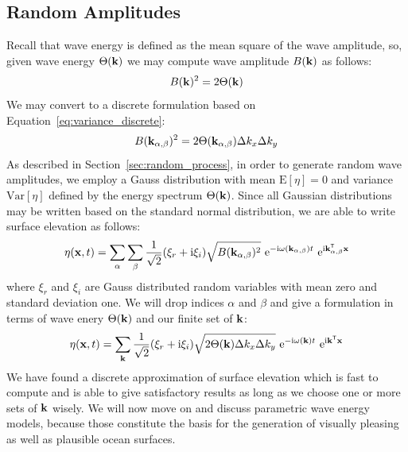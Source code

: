 \subsection{Random Amplitudes}
\label{sec:random_amplitudes}
Recall that wave energy is defined as the mean square of the wave amplitude, so,
given wave energy $\Theta(\mathbf{k})$ we may compute wave amplitude 
$B(\mathbf{k})$ as follows:
\begin{equation*}
 B(\mathbf{k})^2 = 2\Theta(\mathbf{k})
\end{equation*}
We may convert to a discrete formulation based on 
Equation~\ref{eq:variance_discrete}:
\begin{equation*}
 B(\mathbf{k}_{\alpha,\beta})^2 = 2\Theta(\mathbf{k}_{\alpha,\beta})\Delta k_x 
\Delta k_y
\end{equation*}
As described in Section~\ref{sec:random_process}, in order to generate random 
wave amplitudes, we employ a Gauss distribution with mean $\mathrm{E}[\eta] 
= 0$ and variance $\mathrm{Var}[\eta]$ defined by the energy spectrum
$\Theta(\mathbf{k})$. Since all Gaussian distributions may be written based on 
the standard normal distribution, we are able to write surface elevation as 
follows:
\begin{equation*}
 \eta(\mathbf{x}, t) = 
\sum_{\alpha}\sum_{\beta}\frac{1}{\sqrt{2}}(\xi_r+\mathrm{i}\xi_i)\sqrt{B(\mathbf{
k}_{\alpha,\beta})^2}~\mathrm{e}^{-\mathrm{i}\omega(\mathbf{k}_{\alpha,\beta}) 
t}~\mathrm{e}^{\mathrm{i}\mathbf{k}_{\alpha,\beta}^{\mathsf{T}}\mathbf{x}}
\end{equation*}
where $\xi_r$ and $\xi_i$ are Gauss distributed random variables with mean zero 
and standard deviation one. We will drop indices $\alpha$ and $\beta$ and give 
a formulation in terms of wave enery $\Theta(\mathbf{k})$ and our finite set of 
\wavevectors $\mathbf{k}$:
\begin{equation*}
\label{eq:surface_elevation_discrete}
 \eta(\mathbf{x}, t) = 
\sum_{\mathbf{k}}\frac{1}{\sqrt{2}}(\xi_r+\mathrm{i}\xi_i)
\sqrt{2\Theta(\mathbf{k})\Delta k_x \Delta k_y} 
~\mathrm{e}^{-\mathrm{i}\omega(\mathbf{k})t}
~\mathrm{e}^{\mathrm{i}\mathbf{k}^{\mathsf{T}}\mathbf{x}}
\end{equation*}
%
We have found a discrete approximation of surface elevation which is fast to 
compute and is able to give satisfactory results as long as we choose one or 
more sets of \wavevectors $\mathbf{k}$ wisely. We will now move on and discuss
parametric wave energy models, because those constitute the basis for the
generation of visually pleasing as well as plausible ocean surfaces.
%

